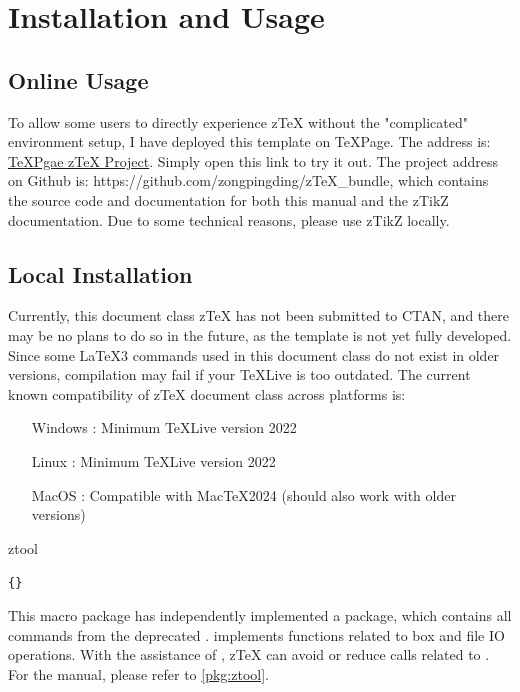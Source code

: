 \documentclass[
  hyper=true,
  class=l3doc, 
  classOption={10pt},
]{../code/ztex}
\newcommand{\ztex}{{}\lowercase{z}\TeX{}}
\newcommand{\zarg}[1]{\texttt{\{}\cmd{#1}\texttt{\}}}
\begin{document}
\section{Installation and Usage}
\subsection{Online Usage}
To allow some users to directly experience \ztex{} without the "complicated" environment setup, I have deployed this template on \TeX{}Page. The address is: \href{https://www.texpage.com/share/e420ac8364a640b78231d65c9d5d7090}{TeXPgae \ztex{} Project}. Simply open this link to try it out. The project address on Github is: https://github.com/zongpingding/zTeX\_bundle, which contains the source code and documentation for both this manual and the zTikZ documentation. Due to some technical reasons, please use zTikZ locally.

\subsection{Local Installation}
Currently, this document class \ztex{} has not been submitted to CTAN, and there may be no plans to do so in the future, as the template is not yet fully developed. Since some \LaTeX3 commands used in this document class do not exist in older versions, compilation may fail if your \TeX{}Live is too outdated. The current known compatibility of \ztex{} document class across platforms is:

\hspace*{10em}\parbox{8cm}{
\begin{itemize}
  \item[Windows]: Minimum \TeX{}Live version 2022
  \item[Linux]: Minimum \TeX{}Live version 2022
  \item[MacOS]: Compatible with Mac{}\TeX{}2024 (should also work with older versions)
\end{itemize}}

\begin{function}[updated=2024-12-05]{ztool}
  \begin{syntax}
    \zarg{ztool}
  \end{syntax}
  This macro package has independently implemented a  package, which contains all commands from the deprecated .  implements functions related to box and file IO operations. With the assistance of , \ztex{} can avoid or reduce calls related to . For the  manual, please refer to \cref{pkg:ztool}.
\end{function}
\end{document}
